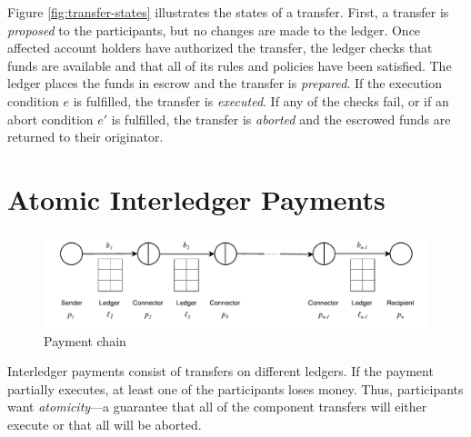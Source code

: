\documentclass[letterpaper,twocolumn,10pt]{article}
\begin{document}
Figure \ref{fig:transfer-states} illustrates the states of a transfer. First, a transfer is \textit{proposed} to the participants, but no changes are made to the ledger. Once affected account holders have authorized the transfer, the ledger checks that funds are available and that all of its rules and policies have been satisfied. The ledger places the funds in escrow and the transfer is \textit{prepared}. If the execution condition $e$ is fulfilled, the transfer is \textit{executed}. If any of the checks fail, or if an abort condition $e'$ is fulfilled, the transfer is \textit{aborted} and the escrowed funds are returned to their originator.



\section{Atomic Interledger Payments}
\label{sec:atomic}

\begin{figure}[th!]
    \centering
    \includegraphics[width=\textwidth]{figures/payment-chain.pdf}
    \caption{Payment chain}
    \label{fig:n-bells}
\end{figure}




Interledger payments consist of transfers on different ledgers. If the payment partially executes, at least one of the participants loses money. Thus, participants want \textit{atomicity}---a guarantee that all of the component transfers will either execute or that all will be aborted.
\end{document}
